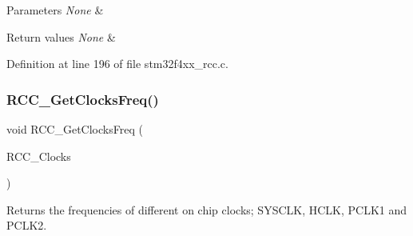 \begin{DoxyParams}{Parameters}
{\em None} & \\
\hline
\end{DoxyParams}

\begin{DoxyRetVals}{Return values}
{\em None} & \\
\hline
\end{DoxyRetVals}


Definition at line 196 of file stm32f4xx\+\_\+rcc.\+c.

\mbox{\label{group___r_c_c_ga3e9944fd1ed734275222bbb3e3f29993}} 
\subsubsection{\texorpdfstring{R\+C\+C\+\_\+\+Get\+Clocks\+Freq()}{RCC\_GetClocksFreq()}}
{\footnotesize\ttfamily void R\+C\+C\+\_\+\+Get\+Clocks\+Freq (\begin{DoxyParamCaption}\item[{\hyperlink{struct_r_c_c___clocks_type_def}{R\+C\+C\+\_\+\+Clocks\+Type\+Def} $\ast$}]{R\+C\+C\+\_\+\+Clocks }\end{DoxyParamCaption})}



Returns the frequencies of different on chip clocks; S\+Y\+S\+C\+LK, H\+C\+LK, P\+C\+L\+K1 and P\+C\+L\+K2. 

